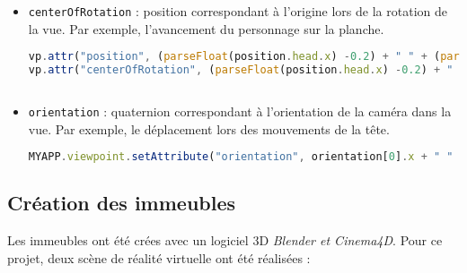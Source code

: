 \begin{enumerate}
\begin{itemize}
\item \texttt{centerOfRotation} : position correspondant à l'origine lors de la rotation de la vue. Par exemple, l'avancement du personnage sur la planche. 
\begin{lstlisting}[language=JavaScript]	
vp.attr("position", (parseFloat(position.head.x) -0.2) + " " + (parseFloat(position.head.y) -0.2)+ " " + (parseFloat(position.head.z) -0.2));
vp.attr("centerOfRotation", (parseFloat(position.head.x) -0.2) + " " + (parseFloat(position.head.y) -0.2)+ " " + (parseFloat(position.head.z) -0.2));
			
\end{lstlisting}

\item \texttt{orientation} : quaternion correspondant à l'orientation de la caméra dans la vue. Par exemple, le déplacement lors des mouvements de la tête. 
\begin{lstlisting}[language=JavaScript]	
MYAPP.viewpoint.setAttribute("orientation", orientation[0].x + " " + orientation[0].y + " " + orientation[0].z + " " + orientation[1]);
\end{lstlisting}
\end{itemize}

\end{enumerate}


\subsection{Création des immeubles}  \label{immeubles}
Les immeubles ont été crées avec un logiciel 3D \textit{Blender et Cinema4D}. Pour ce projet, deux scène de réalité virtuelle ont été réalisées : \\

